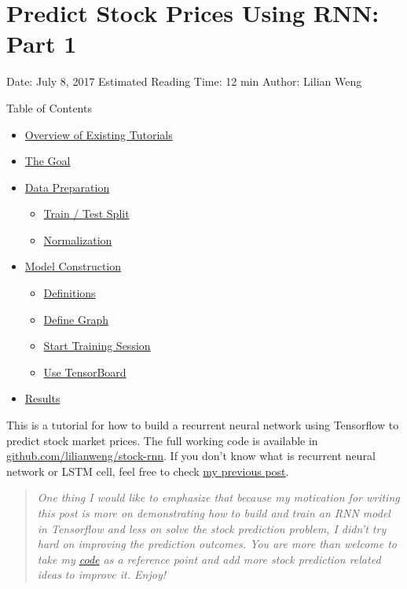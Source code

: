\section{Predict Stock Prices Using RNN: Part 1}\label{predict-stock-prices-using-rnn-part-1}

Date: July 8, 2017 \textbar{} Estimated Reading Time: 12 min \textbar{} Author: Lilian Weng

{Table of Contents}

\begin{itemize}
\tightlist
\item
  \hyperref[overview-of-existing-tutorials]{Overview of Existing Tutorials}
\item
  \hyperref[the-goal]{The Goal}
\item
  \hyperref[data-preparation]{Data Preparation}

  \begin{itemize}
  \tightlist
  \item
    \hyperref[train--test-split]{Train / Test Split}
  \item
    \hyperref[normalization]{Normalization}
  \end{itemize}
\item
  \hyperref[model-construction]{Model Construction}

  \begin{itemize}
  \tightlist
  \item
    \hyperref[definitions]{Definitions}
  \item
    \hyperref[define-graph]{Define Graph}
  \item
    \hyperref[start-training-session]{Start Training Session}
  \item
    \hyperref[use-tensorboard]{Use TensorBoard}
  \end{itemize}
\item
  \hyperref[results]{Results}
\end{itemize}

This is a tutorial for how to build a recurrent neural network using Tensorflow to predict stock market prices. The full working code is available in \href{https://github.com/lilianweng/stock-rnn}{github.com/lilianweng/stock-rnn}. If you don't know what is recurrent neural network or LSTM cell, feel free to check \href{https://lilianweng.github.io/posts/2017-06-21-overview/\#recurrent-neural-network}{my previous post}.

\begin{quote}
\emph{One thing I would like to emphasize that because my motivation for writing this post is more on demonstrating how to build and train an RNN model in Tensorflow and less on solve the stock prediction problem, I didn't try hard on improving the prediction outcomes. You are more than welcome to take my \href{https://github.com/lilianweng/stock-rnn}{code} as a reference point and add more stock prediction related ideas to improve it. Enjoy!}
\end{quote}

